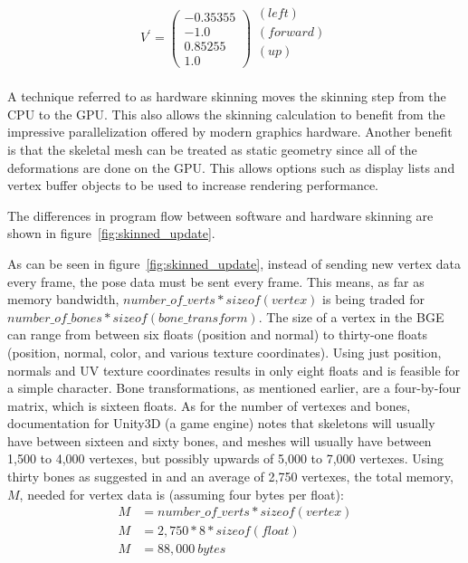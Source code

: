 \begin{gather}
 V^\prime = \left(\begin{array}{c}-0.35355\\-1.0\\0.85255\\1.0\end{array}\right)\begin{array}{c}(left)\\(forward)\\(up)\\ \\\end{array}
\end{gather}


A technique referred to as hardware skinning moves the skinning step from the CPU to the GPU.
This also allows the skinning calculation to benefit from the impressive parallelization offered by modern graphics hardware.
Another benefit is that the skeletal mesh can be treated as static geometry since all of the deformations are done on the GPU.
This allows options such as display lists and vertex buffer objects\cite{ARB_texture_buffer_object} to be used to increase rendering performance.

The differences in program flow between software and hardware skinning are shown in figure~\ref{fig:skinned_update}.


As can be seen in figure~\ref{fig:skinned_update}, instead of sending new vertex data every frame, the pose data must be sent every frame.
This means, as far as memory bandwidth, $number\_of\_verts*sizeof(vertex)$ is being traded for $number\_of\_bones*sizeof(bone\_transform)$.
The size of a vertex in the BGE can range from between six floats (position and normal) to thirty-one floats (position, normal, color, and various texture coordinates).
Using just position, normals and UV texture coordinates results in only eight floats and is feasible for a simple character.
Bone transformations, as mentioned earlier, are a four-by-four matrix, which is sixteen floats.
As for the number of vertexes and bones, documentation for Unity3D (a game engine) notes that skeletons will usually have between sixteen and sixty bones, and meshes will usually have between 1,500 to 4,000 vertexes, but possibly upwards of 5,000 to 7,000 vertexes\cite{unity_opt_char}.
Using thirty bones as suggested in \cite{unity_opt_char} and an average of 2,750 vertexes, the total memory, $M$, needed for vertex data is (assuming four bytes per float):
\begin{align*}
 M &= number\_of\_verts*sizeof(vertex)\\
 M &= 2,750 * 8 * sizeof(float)\\
 M &= 88,000\ bytes
\end{align*}

